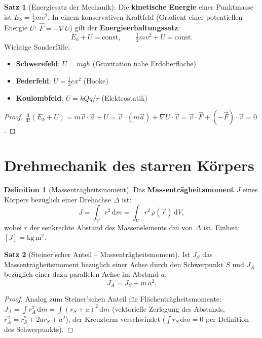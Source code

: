 ﻿\documentclass[a4paper,12pt]{report}
\theoremstyle{definition}
\newtheorem{definition}{Definition}
\newtheorem{satz}{Satz}
\begin{document}
\begin{satz}[Energiesatz der Mechanik]
Die \textbf{kinetische Energie} einer Punktmasse ist $E_k = \tfrac{1}{2}mv^2$.
In einem konservativen Kraftfeld (Gradient einer potentiellen Energie $U$:
$\vec{F} = -\nabla U$) gilt der \textbf{Energieerhaltungssatz}:
\[
  E_k + U = \mathrm{const}, \qquad \tfrac{1}{2}mv^2 + U = \mathrm{const}.
\]
Wichtige Sonderf\"alle:
\begin{itemize}
    \item[-] \textbf{Schwerefeld}: $U = mgh$ (Gravitation nahe Erdoberfl\"ache)
    \item[-] \textbf{Federfeld}: $U = \tfrac{1}{2}cx^2$ (Hooke)
    \item[-] \textbf{Koulombfeld}: $U = kQq/r$ (Elektrostatik)
\end{itemize}
\end{satz}
\begin{proof}
$\frac{\mathrm{d}}{\mathrm{d}t}(E_k + U) = m\vec{v}\cdot\vec{a} + \dot{U}
= \vec{v}\cdot(m\vec{a}) + \nabla U \cdot \vec{v}
= \vec{v}\cdot\vec{F} + (-\vec{F})\cdot\vec{v} = 0$.
\end{proof}

\section{Drehmechanik des starren K\"orpers}

\begin{definition}[Massentr\"agheitsmoment]
Das \textbf{Massentr\"agheitsmoment} $J$ eines K\"orpers bez\"uglich
einer Drehachse $\Delta$ ist:
\[
  J = \int_V r^2\,\mathrm{d}m = \int_V r^2\,\rho(\vec{r})\,\mathrm{d}V,
\]
wobei $r$ der senkrechte Abstand des Massenelements $\mathrm{d}m$ von $\Delta$ ist.
Einheit: $[J] = \mathrm{kg\,m^2}$.
\end{definition}

\begin{satz}[Steiner'scher Anteil -- Massentr\"agheitsmoment]
Ist $J_S$ das Massentr\"agheitsmoment bez\"uglich einer Achse durch den
Schwerpunkt $S$ und $J_A$ bez\"uglich einer dazu parallelen Achse im Abstand $a$:
\[
  J_A = J_S + m\,a^2.
\]
\end{satz}
\begin{proof}
Analog zum Steiner'schen Anteil f\"ur Fl\"achentr\"agheitsmomente:
$J_A = \int r_A^2\,\mathrm{d}m = \int(r_S + a)^2\,\mathrm{d}m$
(vektorielle Zerlegung des Abstands, $r_A^2 = r_S^2 + 2ar_S + a^2$),
der Kreuzterm verschwindet ($\int r_S\,\mathrm{d}m = 0$ per Definition des Schwerpunkts).
\end{proof}
\end{document}
